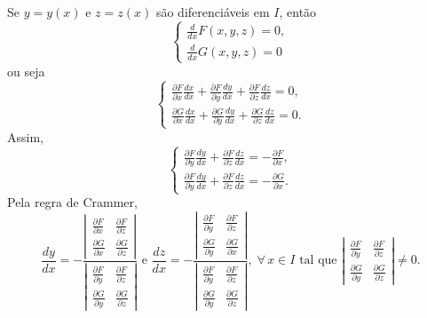     Se \(y = y(x)\) e \(z = z(x)\) são diferenciáveis em \(I\), então
        \[\begin{cases}
            \frac{d}{dx} F(x,y,z) = 0,\\
            \frac{d}{dx} G(x,y,z) = 0
        \end{cases}\]
    ou seja
        \[\begin{cases}
            \frac{\partial F}{\partial x} \frac{dx}{dx} + \frac{\partial F}{\partial y} \frac{dy}{dx} + \frac{\partial F}{\partial z} \frac{dz}{dx} = 0, \\
            \frac{\partial G}{\partial x} \frac{dx}{dx} + \frac{\partial G}{\partial y} \frac{dy}{dx} + \frac{\partial G}{\partial z} \frac{dz}{dx} = 0.
        \end{cases}\]
    Assim,
        \[\begin{cases}
            \frac{\partial F}{\partial y} \frac{dy}{dx} + \frac{\partial F}{\partial z} \frac{dz}{dx} = - \frac{\partial F}{\partial x}, \\
            \frac{\partial F}{\partial y} \frac{dy}{dx} + \frac{\partial F}{\partial z} \frac{dz}{dx} = - \frac{\partial G}{\partial x}.
        \end{cases}\]
    Pela regra de Crammer,
        \[\frac{dy}{dx} = -\frac{\left|\begin{matrix}
            \frac{\partial F}{\partial x} & \frac{\partial F}{\partial z} \\ \frac{\partial G}{\partial x} & \frac{\partial G}{\partial z}
        \end{matrix}\right|}{\left|\begin{matrix}
            \frac{\partial F}{\partial y} & \frac{\partial F}{\partial z} \\ \frac{\partial G}{\partial y} & \frac{\partial G}{\partial z}
        \end{matrix}\right|} 
        \text{ e } 
        \frac{dz}{dx} = -\frac{\left|\begin{matrix}
            \frac{\partial F}{\partial y} & \frac{\partial F}{\partial z} \\ \frac{\partial G}{\partial y} & \frac{\partial G}{\partial x}
        \end{matrix}\right|}{\left|\begin{matrix}
            \frac{\partial F}{\partial y} & \frac{\partial F}{\partial z} \\ \frac{\partial G}{\partial y} & \frac{\partial G}{\partial z}
        \end{matrix}\right|},\; \forall\, x\in I \text{ tal que } \left|\begin{matrix}
            \frac{\partial F}{\partial y} & \frac{\partial F}{\partial z} \\ \frac{\partial G}{\partial y} & \frac{\partial G}{\partial z}
        \end{matrix}\right| \neq 0.\]

